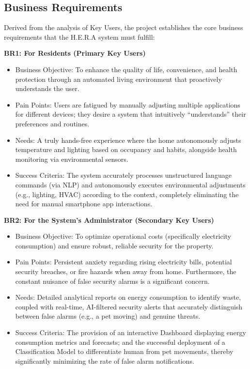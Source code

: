 \subsection{Business Requirements}
Derived from the analysis of Key Users, the project establishes the core business requirements that the H.E.R.A system must fulfill:

\noindent \textbf{BR1: For Residents (Primary Key Users)}
\begin{itemize}
    \item Business Objective: To enhance the quality of life, convenience, and health protection through an automated living environment that proactively understands the user.
    \item Pain Points: Users are fatigued by manually adjusting multiple applications for different devices; they desire a system that intuitively ``understands'' their preferences and routines.
    \item Needs: A truly hands-free experience where the home autonomously adjusts temperature and lighting based on occupancy and habits, alongside health monitoring via environmental sensors.
    \item Success Criteria: The system accurately processes unstructured language commands (via NLP) and autonomously executes environmental adjustments (e.g., lighting, HVAC) according to the context, completely eliminating the need for manual smartphone app interactions.
\end{itemize}


\noindent \textbf{BR2: For the System's Administrator (Secondary Key Users)}
\begin{itemize}
    \item Business Objective: To optimize operational costs (specifically electricity consumption) and ensure robust, reliable security for the property.
    \item Pain Points: Persistent anxiety regarding rising electricity bills, potential security breaches, or fire hazards when away from home. Furthermore, the constant nuisance of false security alarms is a significant concern.
    \item Needs: Detailed analytical reports on energy consumption to identify waste, coupled with real-time, AI-filtered security alerts that accurately distinguish between false alarms (e.g., a pet moving) and genuine threats.
    \item Success Criteria: The provision of an interactive Dashboard displaying energy consumption metrics and forecasts; and the successful deployment of a Classification Model to differentiate human from pet movements, thereby significantly minimizing the rate of false alarm notifications.
\end{itemize}

